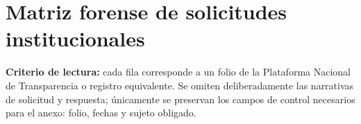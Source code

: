 \documentclass[11pt,letterpaper]{article}
\begin{document}
\section*{Matriz forense de solicitudes institucionales}

\begin{tcolorbox}[
  enhanced,
  colback=AzulFederal!4,
  colframe=AzulFederal,
  boxrule=0.55pt,
  arc=1.5mm,
  left=6pt,right=6pt,top=5pt,bottom=5pt
]
\textbf{Criterio de lectura:} cada fila corresponde a un folio de la Plataforma Nacional de Transparencia o registro equivalente. Se omiten deliberadamente las narrativas de solicitud y respuesta; únicamente se preservan los campos de control necesarios para el anexo: folio, fechas y sujeto obligado.
\end{tcolorbox}

\vspace{2mm}
\end{document}
